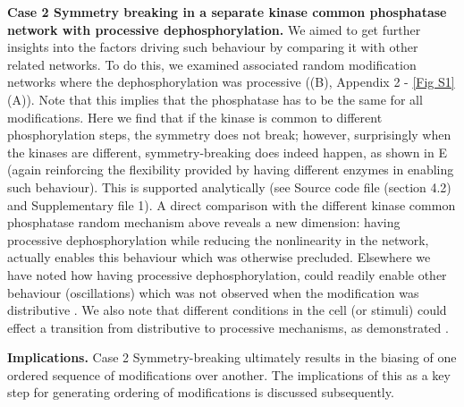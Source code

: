 \documentclass[9pt,lineno]{elife}
\begin{document}
{\bf Case 2 Symmetry breaking in a separate kinase common phosphatase network with processive dephosphorylation.} We aimed to get further insights into the factors driving such behaviour by comparing it with other related networks.
To do this, we examined associated random modification networks where the dephosphorylation was processive ((B), Appendix 2 - \cref{Fig S1}(A)). Note that this implies that the phosphatase has to be the same for all modifications. Here we find that if the kinase is common to different phosphorylation steps, the symmetry does not break; however, surprisingly when the kinases are different, 
symmetry-breaking does indeed happen, as shown in E (again reinforcing the flexibility provided by having different enzymes in enabling such behaviour). This is supported analytically (see Source code file (section 4.2) and Supplementary file 1).
A direct comparison with the different kinase common phosphatase random mechanism above reveals a new dimension: having processive dephosphorylation while reducing the nonlinearity in the network, actually enables this behaviour which was otherwise precluded. Elsewhere we have noted how having processive dephosphorylation, could  readily enable other behaviour (oscillations) which was not observed when the modification was distributive \cite{Suwanmajo2015}. We also note that different conditions in the cell (or stimuli) could effect a transition from distributive to processive mechanisms, as demonstrated \cite{Aoki2011, Aoki2013, Kocieniewski2012}.

{\bf Implications.} Case 2 Symmetry-breaking ultimately results in the biasing of one ordered sequence of modifications over another. The implications of this  as a key step for generating ordering of modifications is discussed subsequently.
\end{document}
